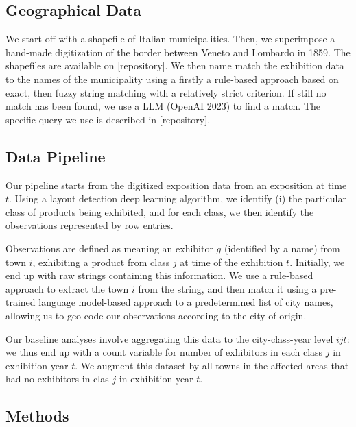 \subsection{Geographical Data}

We start off with a shapefile of Italian municipalities. Then, we superimpose a hand-made digitization of the border between Veneto and Lombardo in 1859. The shapefiles are available on [repository]. We then name match the exhibition data to the names of the municipality using a firstly a rule-based approach based on exact, then fuzzy string matching with a relatively strict criterion. If still no match has been found, we use a LLM (OpenAI 2023) to find a match. The specific query we use is described in [repository]. 

\subsection{Data Pipeline}



Our pipeline starts from the digitized exposition data from an exposition at time $t$. Using a layout detection deep learning algorithm, we identify (i) the particular class of products being exhibited, and for each class, we then identify the observations represented by row entries. 

Observations are defined as meaning an exhibitor $g$ (identified by a name) from town $i$, exhibiting a product from class $j$ at time of the exhibition $t$. Initially, we end up with raw strings containing this information. We use a rule-based approach to extract the town $i$ from the string, and then match it using a pre-trained language model-based approach to a predetermined list of city names, allowing us to geo-code our observations according to the city of origin. 

Our baseline analyses involve aggregating this data to the city-class-year level $ijt$: we thus end up with a count variable for number of exhibitors in each class $j$ in exhibition year $t$. We augment this dataset by all towns in the affected areas that had no exhibitors in clas $j$ in exhibition year $t$. 



\subsection{Methods}

